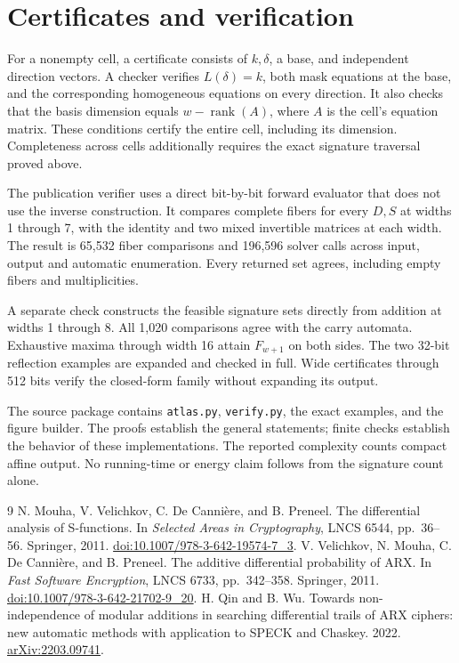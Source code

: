 \documentclass[11pt,a4paper]{article}
\theoremstyle{definition}\newtheorem{definition}[theorem]{Definition}
\DeclareMathOperator{\rank}{rank}
\begin{document}
\section{Certificates and verification}
For a nonempty cell, a certificate consists of $k,\delta$, a base, and
independent direction vectors. A checker verifies $L(\delta)=k$, both
mask equations at the base, and the corresponding homogeneous equations
on every direction. It also checks that the basis dimension equals
$w-\rank(A)$, where $A$ is the cell's equation matrix. These conditions
certify the entire cell, including its dimension. Completeness across
cells additionally requires the exact signature traversal proved above.

The publication verifier uses a direct bit-by-bit forward evaluator that
does not use the inverse construction. It compares complete fibers for
every $D,S$ at widths 1 through 7, with the identity and two mixed
invertible matrices at each width. The result is 65,532 fiber comparisons
and 196,596 solver calls across input, output and automatic enumeration.
Every returned set agrees, including empty fibers and multiplicities.

A separate check constructs the feasible signature sets directly from
addition at widths 1 through 8. All 1,020 comparisons agree with the
carry automata. Exhaustive maxima through width 16 attain $F_{w+1}$
on both sides. The two 32-bit reflection examples are expanded and
checked in full. Wide certificates through 512 bits verify the
closed-form family without expanding its output.

The source package contains \texttt{atlas.py}, \texttt{verify.py}, the
exact examples, and the figure builder. The proofs establish the general
statements; finite checks establish the behavior of these implementations.
The reported complexity counts compact affine output. No running-time
or energy claim follows from the signature count alone.

\begin{thebibliography}{9}
N. Mouha, V. Velichkov, C. De Canni\`ere, and B. Preneel.
The differential analysis of S-functions.
In \emph{Selected Areas in Cryptography}, LNCS 6544, pp.~36--56.
Springer, 2011. \href{https://doi.org/10.1007/978-3-642-19574-7_3}{doi:10.1007/978-3-642-19574-7\_3}.
V. Velichkov, N. Mouha, C. De Canni\`ere, and B. Preneel.
The additive differential probability of ARX.
In \emph{Fast Software Encryption}, LNCS 6733, pp.~342--358.
Springer, 2011. \href{https://doi.org/10.1007/978-3-642-21702-9_20}{doi:10.1007/978-3-642-21702-9\_20}.
H. Qin and B. Wu.
Towards non-independence of modular additions in searching differential
trails of ARX ciphers: new automatic methods with application to SPECK
and Chaskey. 2022. \href{https://arxiv.org/abs/2203.09741}{arXiv:2203.09741}.
\end{thebibliography}
\end{document}
